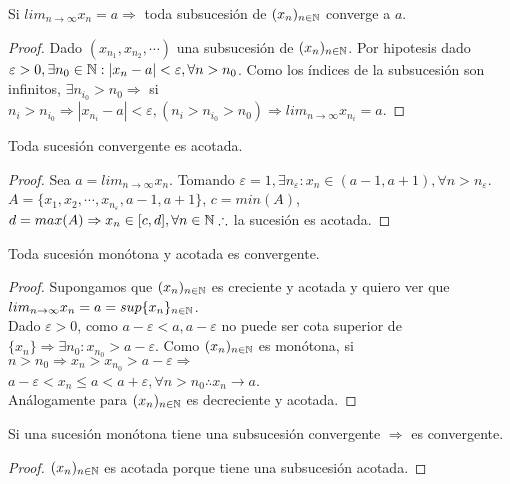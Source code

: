 \begin{theorem}
  Si $lim_{n \to \infty} x_n = a \Rightarrow$ toda subsucesión de $(x_n)_{n \in \mathbb{N}}$ converge a $a$.

  \begin{proof}
    Dado $(x_{n_1}, x_{n_2}, \cdots)$ una subsucesión de $(x_n)_{n \in \mathbb{N}}$. Por hipotesis dado $\varepsilon > 0, \exists n_0 \in \mathbb{N} : |x_n - a| < \varepsilon, \forall n > n_0$. Como los índices de la subsucesión son infinitos, $\exists n_{i_0} > n_0 \Rightarrow$ si $n_i > n_{i_0} \Rightarrow |x_{n_i} - a| < \varepsilon, (n_i > n_{i_0} > n_0) \Rightarrow lim_{n \to \infty} x_{n_i} = a$.
  \end{proof}
\end{theorem}

\begin{theorem}
  Toda sucesión convergente es acotada.
  \begin{proof}
    Sea $a = lim_{n \to \infty} x_n$. Tomando $\varepsilon = 1, \exists n_{\varepsilon} : x_n \in (a - 1, a+1), \forall n > n_{\varepsilon}$. \\
    $A = \{ x_1, x_2, \cdots, x_{n_{\varepsilon}}, a-1, a+1 \}$, $c = min(A)$, $d = max(A) \Rightarrow x_n \in [c, d], \forall n \in \mathbb{N} \therefore $ la sucesión es acotada.
  \end{proof}
\end{theorem}

\begin{theorem}
  Toda sucesión monótona y acotada es convergente.
  \begin{proof}
    Supongamos que $(x_n)_{n \in \mathbb{N}}$ es creciente y acotada y quiero ver que $lim_{n \to \infty} x_n = a = sup\{x_n\}_{n \in \mathbb{N}}$. \\
    Dado $\varepsilon > 0$, como $a-\varepsilon < a, a-\varepsilon$ no puede ser cota superior de $\{x_n\} \Rightarrow \exists n_0 : x_{n_0} > a - \varepsilon$.
    Como $(x_n)_{n \in \mathbb{N}}$ es monótona, si $n > n_0 \Rightarrow x_n > x_{n_0} > a - \varepsilon \Rightarrow$ \\
    $a-\varepsilon < x_n \leq a < a+\varepsilon, \forall n > n_0 \therefore x_n \to a$. \\
    Análogamente para $(x_n)_{n \in \mathbb{N}}$ es decreciente y acotada.
  \end{proof}
\end{theorem}

\begin{corollary}
  Si una sucesión monótona tiene una subsucesión convergente $\Rightarrow$ es convergente.
  \begin{proof}
    $(x_n)_{n \in \mathbb{N}}$ es acotada porque tiene una subsucesión acotada.
  \end{proof}
\end{corollary}

